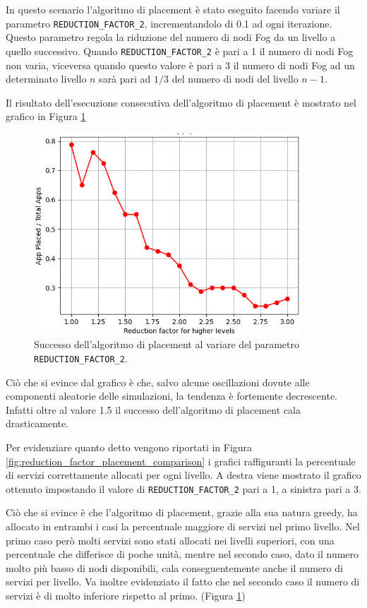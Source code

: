 In questo scenario l'algoritmo di placement è stato eseguito facendo variare il parametro \texttt{REDUCTION\_FACTOR\_2}, incrementandolo di 0.1 ad ogni iterazione. Questo parametro regola la riduzione del numero di nodi Fog da un livello a quello successivo. Quando \texttt{REDUCTION\_FACTOR\_2} è pari a 1 il numero di nodi Fog non varia, viceversa quando questo valore è pari a 3 il numero di nodi Fog ad un determinato livello $n$ sarà pari ad $1/3$ del numero di nodi del livello $n-1$.

Il risultato dell'esecuzione consecutiva dell'algoritmo di placement è mostrato nel grafico in Figura \ref{fig:nodes_number_placement_success}

\begin{figure}[!ht]
  \includegraphics[width=10cm]{images/nodes_number_placement_success}
  \centering
  \caption{Successo dell'algoritmo di placement al variare del parametro \texttt{REDUCTION\_FACTOR\_2}.}
  \label{fig:nodes_number_placement_success}
\end{figure}

Ciò che si evince dal grafico è che, salvo alcune oscillazioni dovute alle componenti aleatorie delle simulazioni, la tendenza è fortemente decrescente. Infatti oltre al valore 1.5 il successo dell'algoritmo di placement cala drasticamente. 

Per evidenziare quanto detto vengono riportati in Figura \ref{fig:reduction_factor_placement_comparison} i grafici raffiguranti la percentuale di servizi correttamente allocati per ogni livello. A destra viene mostrato il grafico ottenuto impostando il valore di \texttt{REDUCTION\_FACTOR\_2} pari a 1, a sinistra pari a 3. 

Ciò che si evince è che l'algoritmo di placement, grazie alla sua natura greedy, ha allocato in entrambi i casi la percentuale maggiore di servizi nel primo livello. Nel primo caso però molti servizi sono stati allocati nei livelli superiori, con una percentuale che differisce di poche unità, mentre nel secondo caso, dato il numero molto più basso di nodi disponibili, cala conseguentemente anche il numero di servizi per livello. Va inoltre evidenziato il fatto che nel secondo caso il numero di servizi è di molto inferiore rispetto al primo. (Figura \ref{fig:nodes_number_placement_success})

